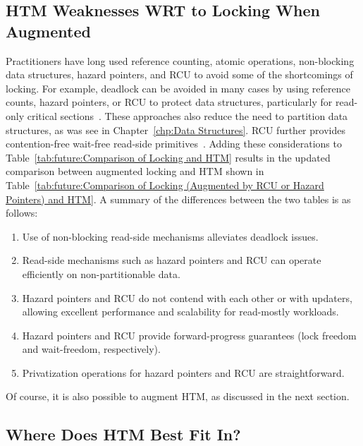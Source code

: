 \subsection{HTM Weaknesses WRT to Locking When Augmented}
\label{sec:future:HTM Weaknesses WRT to Locking When Augmented}



Practitioners have long used reference counting, atomic operations,
non-blocking data structures, hazard pointers, and RCU to avoid some
of the shortcomings of locking.
For example, deadlock can be avoided in many cases by using reference
counts, hazard pointers, or RCU to protect data structures,
particularly for read-only critical
sections~\cite{MagedMichael04a,HerlihyLM02,MathieuDesnoyers2012URCU,DinakarGuniguntala2008IBMSysJ,ThomasEHart2007a}.
These approaches also reduce the need to partition data
structures, as was see in Chapter~\ref{chp:Data Structures}.
RCU further provides contention-free wait-free read-side
primitives~\cite{MathieuDesnoyers2012URCU}.
Adding these considerations to
Table~\ref{tab:future:Comparison of Locking and HTM}
results in the updated comparison between augmented locking and HTM
shown in
Table~\ref{tab:future:Comparison of Locking (Augmented by RCU or Hazard Pointers) and HTM}.
A summary of the differences between the two tables is as follows:

\begin{enumerate}
\item	Use of non-blocking read-side mechanisms alleviates deadlock issues.
\item	Read-side mechanisms such as hazard pointers and RCU can operate
	efficiently on non-partitionable data.
\item	Hazard pointers and RCU do not contend with each other or with
	updaters, allowing excellent performance and scalability for
	read-mostly workloads.
\item	Hazard pointers and RCU provide forward-progress guarantees
	(lock freedom and wait-freedom, respectively).
\item	Privatization operations for hazard pointers and RCU are
	straightforward.
\end{enumerate}

Of course, it is also possible to augment HTM,
as discussed in the next section.

\subsection{Where Does HTM Best Fit In?}
\label{sec:future:Where Does HTM Best Fit In?}

